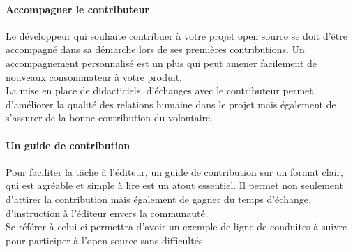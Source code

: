 	\paragraph{Accompagner le contributeur\\}

	Le développeur qui souhaite contribuer à votre projet open source se doit d'être accompagné dans sa démarche lors de ses premières contributions. Un accompagnement personnalisé est un plus qui peut amener facilement de nouveaux consommateur à votre produit.\\

	La mise en place de didacticiels, d'échanges avec le contributeur permet d'améliorer la qualité des relations humaine dans le projet mais également de s'assurer de la bonne contribution du volontaire.

	\paragraph{Un guide de contribution\\}

	Pour faciliter la tâche à l'éditeur, un guide de contribution sur un format clair, qui est agréable et simple à lire est un atout essentiel.
	Il permet non seulement d'attirer la contribution mais également de gagner du temps d'échange, d'instruction à l'éditeur envers la communauté.\\

	Se référer à celui-ci permettra d'avoir un exemple de ligne de conduites à suivre pour participer à l'open source sans difficultés.